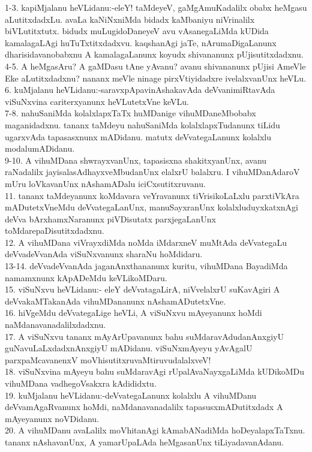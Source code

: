 \documentclass{article}
\begin{document}
1-3. kapiMjalanu heVLidanu:-eleY! taMdeyeV, gaMgAmuKadalilx obabx heMgasu aLutitxdadxLu. avaLa kaNiNxniMda bidadx kaMbaniyu niVrinalilx biVLutitxtutx. bidudx muLugidoDaneyeV avu vAsanegaLiMda kUDida kamalagaLAgi huTuTxtitxdadxvu. kaqshanAgi jaTe, nArumaDigaLanunx dharisidavanobabxnu A kamalagaLanunx koyudx shivananunx pUjisutitxdadxnu.\\
4-5. A heMgasAru? A gaMDasu tAne yAvanu? avanu shivananunx pUjisi AmeVle Eke aLutitxdadxnu? nananx meVle ninage pirxVtiyidadxre ivelalxvanUnx heVLu.\\
6. kuMjalanu heVLidanu:-saravxpApavinAshakavAda deVvanimiRtavAda viSuNxvina cariterxyanunx heVLutetxVne keVLu.\\
7-8. nahuSaniMda kolalxlapxTaTx huMDanige vihuMDaneMbobabx maganidadxnu. tananx taMdeyu nahuSaniMda kolalxlapxTudanunx tiLidu ugarxvAda tapasasxnunx mADidanu. matutx deVvategaLanunx kolalxlu modalumADidanu.\\
9-10. A vihuMDana shwrayxvanUnx, tapasisxna shakitxyanUnx, avanu raNadalilx jayisalasAdhayxveMbudanUnx elalxrU balalxru. I vihuMDanAdaroV mUru loVkavanUnx nAshamADalu iciCxsutitxruvanu.\\
11. tananx taMdeyanunx koMdavara veYravanunx tiVrisikoLaLxlu parxtiVkAra mADutetxVneMdu deVvategaLanUnx, manuSayxranUnx kolalxluduyxkatxnAgi deVva bArxhamxNaranunx piVDisutatx parxjegaLanUnx toMdarepaDisutitxdadxnu.\\
12. A vihuMDana viVrayxdiMda noMda iMdarxneV muMtAda deVvategaLu deVvadeVvanAda viSuNxvanunx sharaNu hoMdidaru.\\
13-14. deVvadeVvanAda jaganAnxthananunx kuritu, vihuMDana BayadiMda namamxnunx kApADeMdu keVLikoMDaru.\\
15. viSuNxvu heVLidanu:- eleY deVvatagaLirA, niVvelalxrU suKavAgiri A deVvakaMTakanAda vihuMDananunx nAshamADutetxVne.\\
16. hiVgeMdu deVvategaLige heVLi, A viSuNxvu mAyeyanunx hoMdi naMdanavanadalilxdadxnu.\\
17. A viSuNxvu tananx mAyArUpavanunx bahu suMdaravAdudanAnxgiyU guNavuLaLxdadxnAnxgiyU mADidanu. viSuNxmAyeyu yAvAgalU parxpaMcavanenxV moVhisutitxruvaMtiruvudalalxveV!\\
18. viSuNxvina mAyeyu bahu suMdaravAgi rUpalAvaNayxgaLiMda kUDikoMDu vihuMDana vadhegoVsakxra kAdididxtu.\\
19. kuMjalanu heVLidanu:-deVvategaLanunx kolalxlu A vihuMDanu deVvamAgaRvanunx hoMdi, naMdanavanadalilx tapasusxmADutitxdadx A mAyeyanunx noVDidanu.\\
20. A vihuMDanu avaLalilx moVhitanAgi kAmabANadiMda hoDeyalapxTaTxnu. tananx nAshavanUnx, A yamarUpaLAda heMgasanUnx tiLiyadavanAdanu.\\
\end{document}
